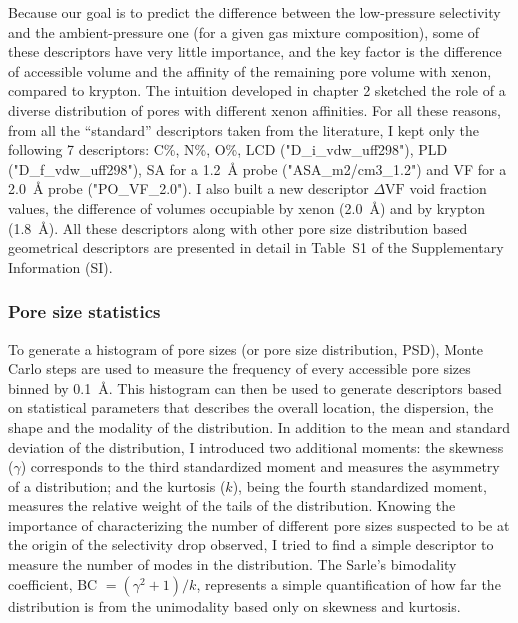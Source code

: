 \documentclass[main]{subfiles}
\begin{document}
Because our goal is to predict the difference between the low-pressure selectivity and the ambient-pressure one (for a given gas mixture composition), some of these descriptors have very little importance, and the key factor is the difference of accessible volume and the affinity of the remaining pore volume with xenon, compared to krypton. The intuition developed in chapter 2 sketched the role of a diverse distribution of pores with different xenon affinities. For all these reasons, from all the ``standard'' descriptors taken from the literature, I kept only the following 7 descriptors: C\%, N\%, O\%, LCD ("D\_i\_vdw\_uff298"), PLD ("D\_f\_vdw\_uff298"), SA for a \SI{1.2}{\angstrom} probe ("ASA\_m2/cm3\_1.2") and VF for a \SI{2.0}{\angstrom} probe ("PO\_VF\_2.0"). I also built a new descriptor $\Delta \text{VF}$ void fraction values, the difference of volumes occupiable by xenon (\SI{2.0}{\angstrom}) and by krypton (\SI{1.8}{\angstrom}). All these descriptors along with other pore size distribution based geometrical descriptors are presented in detail in Table~S1 of the Supplementary Information (SI).

\subsubsection{Pore size statistics}

To generate a histogram of pore sizes (or pore size distribution, PSD), Monte Carlo steps are used to measure the frequency of every accessible pore sizes binned by \SI{0.1}{\angstrom}.\autocite{poresize_Pinheiro2013} This histogram can then be used to generate descriptors based on statistical parameters that describes the overall location, the dispersion, the shape and the modality of the distribution. In addition to the mean and standard deviation of the distribution, I introduced two additional moments: the skewness ($\gamma$) corresponds to the third standardized moment and measures the asymmetry of a distribution; and the kurtosis ($k$), being the fourth standardized moment, measures the relative weight of the tails of the distribution. Knowing the importance of characterizing the number of different pore sizes suspected to be at the origin of the selectivity drop observed, I tried to find a simple descriptor to measure the number of modes in the distribution. The Sarle's bimodality coefficient, BC $= (\gamma^2 +1)/k$, represents a simple quantification of how far the distribution is from the unimodality based only on skewness and kurtosis.\autocite{Tarba_2022}
\end{document}
